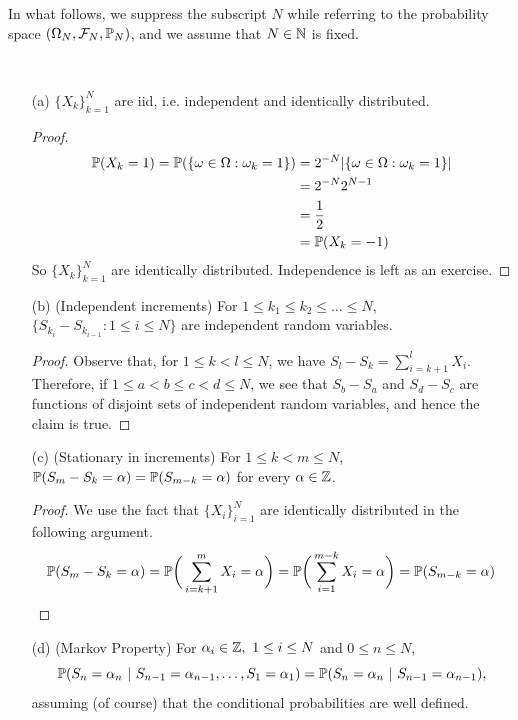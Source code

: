 \documentclass[main]{subfiles}
\begin{document}
In what follows, we suppress the subscript $ N $ while referring to the probability space $ (\O_N,\F_N, \P_N) $, and we assume that $ N\in\N $ is fixed.
\begin{obs}
    $\,$ \normalfont
    \begin{enumerate}
        \item[(a)] $\{X_k\}_{k=1}^N $ are iid, i.e. independent and identically distributed.
            \begin{proof}
                \begin{align*}
                    \P(X_k=1)=\P(\{\o\in\O:\o_k=1\}) & =2^{-N} |\{\o\in\O:\o_k=1\}| \\
                                                     & =2^{-N}2^{N-1}               \\
                                                     & =\frac{1}{2}                 \\
                                                     & =\P(X_k=-1)
                \end{align*}
                So $ \{X_k\}_{k=1}^N $ are identically distributed. Independence is left as an exercise.
            \end{proof}
            \item[(b)](Independent increments) For $ 1\le k_1\le k_2\le \ldots\le N $, $ \{S_{k_i}-S_{k_{i-1}}:1\le i\le N\} $ are independent random variables.

            \begin{proof}
                Observe that, for $ 1\le k<l\le N $, we have $ S_l-S_k=\sum_{i=k+1}^lX_i $. Therefore, if $ 1\le a<b\le c<d\le N $, we see that $ S_b-S_a $ and $ S_d-S_c $ are functions of disjoint sets of independent random variables, and hence the claim is true.
            \end{proof}

            

            \item[(c)](Stationary in increments) For $ 1\le k<m\le N $, $ \P(S_m-S_k=\alpha)=\P(S_{m-k}=\alpha)$ for every $ \alpha\in\Z $.

            \begin{proof}
                We use the fact that $ \{X_i\}_{i=1}^N $ are identically distributed in the following argument. $$ \P(S_m-S_k=\alpha)=\P\bigg(\sum_{i=k+1}^mX_i=\alpha\bigg)=\P\bigg(\sum_{i=1}^{m-k}X_i=\alpha\bigg)=\P(S_{m-k}=\alpha) $$
            \end{proof}
            \item[(d)](Markov Property) For $ \alpha_i\in\Z,\ 1\le i\le N $ and $ 0\le n\le N $, \[ \P(S_n=\alpha_n\ |\ S_{n-1}=\alpha_{n-1}, \ldots, S_1=\alpha_1)=\P(S_n=\alpha_n\ |\ S_{n-1}=\alpha_{n-1}), \] assuming (of course) that the conditional probabilities are well defined.


\end{enumerate}
\end{obs}
\end{document}
